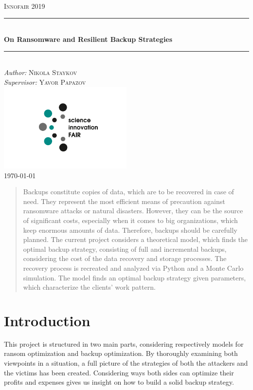 \documentclass[11pt, a4paper]{article}
\theoremstyle{definition}
\begin{document}
\begin{titlepage}
	\newcommand{\HRule}{\rule{\linewidth}{0.5mm}}
	\centering
	\textsc{\LARGE Innofair 2019}\\[1cm]
	\HRule\\[1 cm]
	{\huge\bfseries On Ransomware and Resilient Backup Strategies}\\[0.5 cm] 
	\HRule\\
			\vfill
			\Large
			\textit{Author:}
			\textsc{Nikola Staykov}\\
            \vspace{2cm}
			\Large
			\textit{Supervisor:}
            \textsc{Yavor Papazov}\\
            \includegraphics[width=0.5\textwidth]{Innofair_logo.png}\\
    \vfill	
	{\large\today}   
	\vfill
\end{titlepage}

\tableofcontents
\newpage
\begin{abstract}
		Backups constitute copies of data, which are to be recovered in case of need. They represent the most efficient means of precaution against ransomware attacks or natural disasters. However, they can be the source of significant costs, especially when it comes to big organizations, which keep enormous amounts of data. Therefore, backups should be carefully planned. The current project considers a theoretical model, which finds the optimal   backup strategy, consisting of full and incremental backups, considering the cost of the data recovery and storage processes. The recovery process is recreated and analyzed via Python and a Monte Carlo simulation. The model finds an optimal backup strategy given parameters, which characterize the clients' work pattern.
\end{abstract}

\section{Introduction}
	This project is structured in two main parts, considering respectively models for ransom optimization and backup optimization. By thoroughly examining both viewpoints in a situation, a full picture of the strategies of both the attackers and the victims has been created. Considering ways both sides can optimize their profits and expenses gives us insight on how to build a solid backup strategy.
\end{document}
